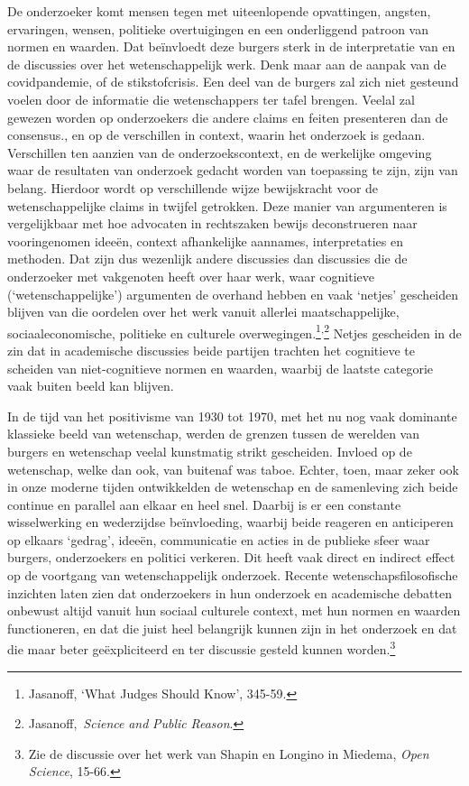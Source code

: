 \documentclass[smallauthor, chapterhaspagenum, nochapterinheader, pagenuminheader,  bigchapnum,medium2, tocpages, garamond, titleinheader]{jote-book}
\begin{document}
	De onderzoeker komt mensen tegen met uiteenlopende opvattingen, angsten, ervaringen, wensen, politieke overtuigingen en een onderliggend patroon van normen en waarden. Dat beïnvloedt deze burgers sterk in de interpretatie van en de discussies over het wetenschappelijk werk. Denk maar aan de aanpak van de covidpandemie, of de stikstofcrisis. Een deel van de burgers zal zich niet gesteund voelen door de informatie die wetenschappers ter tafel brengen. Veelal zal gewezen worden op onderzoekers die andere claims en feiten presenteren dan de consensus., en op de verschillen in context, waarin het onderzoek is gedaan. Verschillen ten aanzien van de onderzoekscontext, en de werkelijke omgeving waar de resultaten van onderzoek gedacht worden van toepassing te zijn, zijn van belang. Hierdoor wordt op verschillende wijze bewijskracht voor de wetenschappelijke claims in twijfel getrokken. Deze manier van argumenteren is vergelijkbaar met hoe advocaten in rechtszaken bewijs deconstrueren naar vooringenomen ideeën, context afhankelijke aannames, interpretaties en methoden. Dat zijn dus wezenlijk andere discussies dan discussies die de onderzoeker met vakgenoten heeft over haar werk, waar cognitieve (‘wetenschappelijke') argumenten de overhand hebben en vaak ‘netjes' gescheiden blijven van die oordelen over het werk vanuit allerlei maatschappelijke, sociaaleconomische, politieke en culturele overwegingen.\footnote{Jasanoff, ‘What Judges Should Know', 345-59.}\textsuperscript{,}\footnote{Jasanoff, \emph{Science}\emph{ }\emph{and}\emph{ Public }\emph{Reason}.} Netjes gescheiden in de zin dat in academische discussies beide partijen trachten het cognitieve te scheiden van niet-cognitieve normen en waarden, waarbij de laatste categorie vaak buiten beeld kan blijven.



	In de tijd van het positivisme van 1930 tot 1970, met het nu nog vaak dominante klassieke beeld van wetenschap, werden de grenzen tussen de werelden van burgers en wetenschap veelal kunstmatig strikt gescheiden. Invloed op de wetenschap, welke dan ook, van buitenaf was taboe. Echter, toen, maar zeker ook in onze moderne tijden ontwikkelden de wetenschap en de samenleving zich beide continue en parallel aan elkaar en heel snel. Daarbij is er een constante wisselwerking en wederzijdse beïnvloeding, waarbij beide reageren en anticiperen op elkaars ‘gedrag', ideeën, communicatie en acties in de publieke sfeer waar burgers, onderzoekers en politici verkeren. Dit heeft vaak direct en indirect effect op de voortgang van wetenschappelijk onderzoek. Recente wetenschapsfilosofische inzichten laten zien dat onderzoekers in hun onderzoek en academische debatten onbewust altijd vanuit hun sociaal culturele context, met hun normen en waarden functioneren, en dat die juist heel belangrijk kunnen zijn in het onderzoek en dat die maar beter geëxpliciteerd en ter discussie gesteld kunnen worden.\footnote{Zie de discussie over het werk van Shapin en Longino in Miedema, \emph{Open }\emph{Science}, 15-66.}
\end{document}
